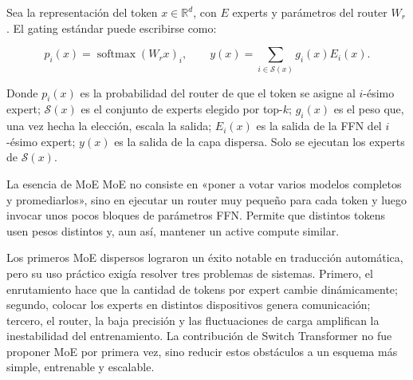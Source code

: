 Sea la representación del token $x\in\mathbb{R}^{d}$, con $E$ experts y parámetros del router $W_r$. El gating estándar puede escribirse como:

\[
p_i(x)=\operatorname{softmax}(W_rx)_i,
\qquad
y(x)=\sum_{i\in\mathcal{S}(x)} g_i(x)E_i(x).
\]

Donde $p_i(x)$ es la probabilidad del router de que el token se asigne al $i$-ésimo expert; $\mathcal{S}(x)$ es el conjunto de experts elegido por top-$k$; $g_i(x)$ es el peso que, una vez hecha la elección, escala la salida; $E_i(x)$ es la salida de la FFN del $i$-ésimo expert; $y(x)$ es la salida de la capa dispersa. Solo se ejecutan los experts de $\mathcal{S}(x)$.


\begin{importantbox}{La esencia de MoE}
MoE no consiste en «poner a votar varios modelos completos y promediarlos», sino en ejecutar un router muy pequeño para cada token y luego invocar unos pocos bloques de parámetros FFN. Permite que distintos tokens usen pesos distintos y, aun así, mantener un active compute similar.
\end{importantbox}


Los primeros MoE dispersos lograron un éxito notable en traducción automática, pero su uso práctico exigía resolver tres problemas de sistemas. Primero, el enrutamiento hace que la cantidad de tokens por expert cambie dinámicamente; segundo, colocar los experts en distintos dispositivos genera comunicación; tercero, el router, la baja precisión y las fluctuaciones de carga amplifican la inestabilidad del entrenamiento. La contribución de Switch Transformer no fue proponer MoE por primera vez, sino reducir estos obstáculos a un esquema más simple, entrenable y escalable.


